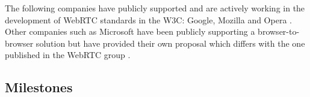 The following companies have publicly supported and are actively working in the development of WebRTC standards in the W3C: Google, Mozilla and Opera \cite{googleAnnouncement}. Other companies such as Microsoft have been publicly supporting a browser-to-browser solution but have provided their own proposal which differs with the one published in the WebRTC group \cite{curtcweb}.

\subsection{Milestones}